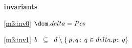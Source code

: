 \textbf{invariants}
\begin{block}
\item[ \eqref{m3:inv0} ]{$\dom.delta = Pcs $} %
\item[ \eqref{m3:inv1} ]{$b \; \; \subseteq \; \; d \setminus { \{ \:p,q\!:\, q \in delta.p\!:\, q \} } $} %
\end{block}
